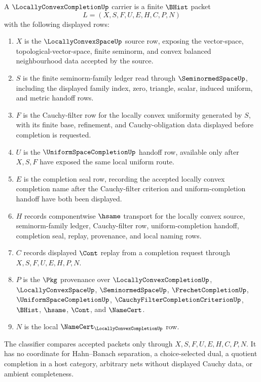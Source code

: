 \begin{definition}
\label{def:locally-convex-completion-carrier}
A $\LocallyConvexCompletionUp$ carrier is a finite $\BHist$ packet
$$
L=(X,S,F,U,E,H,C,P,N)
$$
with the following displayed rows:
\begin{enumerate}
\item $X$ is the $\LocallyConvexSpaceUp$ source row, exposing the vector-space, topological-vector-space, finite seminorm, and convex balanced neighbourhood data accepted by the source.
\item $S$ is the finite seminorm-family ledger read through $\SeminormedSpaceUp$, including the displayed family index, zero, triangle, scalar, induced uniform, and metric handoff rows.
\item $F$ is the Cauchy-filter row for the locally convex uniformity generated by $S$, with its finite base, refinement, and Cauchy-obligation data displayed before completion is requested.
\item $U$ is the $\UniformSpaceCompletionUp$ handoff row, available only after $X,S,F$ have exposed the same local uniform route.
\item $E$ is the completion seal row, recording the accepted locally convex completion name after the Cauchy-filter criterion and uniform-completion handoff have both been displayed.
\item $H$ records componentwise $\hsame$ transport for the locally convex source, seminorm-family ledger, Cauchy-filter row, uniform-completion handoff, completion seal, replay, provenance, and local naming rows.
\item $C$ records displayed $\Cont$ replay from a completion request through $X,S,F,U,E,H,P,N$.
\item $P$ is the $\Pkg$ provenance over $\LocallyConvexCompletionUp$, $\LocallyConvexSpaceUp$, $\SeminormedSpaceUp$, $\FrechetCompletionUp$, $\UniformSpaceCompletionUp$, $\CauchyFilterCompletionCriterionUp$, $\BHist$, $\hsame$, $\Cont$, and $\NameCert$.
\item $N$ is the local $\NameCert_{\LocallyConvexCompletionUp}$ row.
\end{enumerate}
The classifier compares accepted packets only through $X,S,F,U,E,H,C,P,N$. It has no coordinate for Hahn--Banach separation, a choice-selected dual, a quotient completion in a host category, arbitrary nets without displayed Cauchy data, or ambient completeness.
\end{definition}

